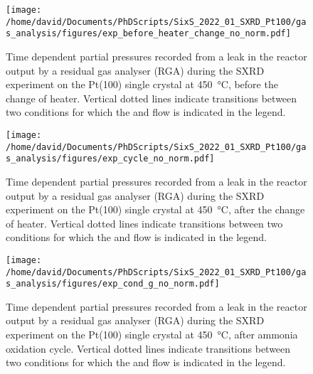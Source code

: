\begin{figure}[!htb]
    \centering
    \texttt{[image: /home/david/Documents/PhDScripts/SixS\_2022\_01\_SXRD\_Pt100/gas\_analysis/figures/exp\_before\_heater\_change\_no\_norm.pdf]}
    \caption{
        Time dependent partial pressures recorded from a leak in the reactor output by a residual gas analyser (RGA) during the SXRD experiment on the Pt(100) single crystal at \qty{450}{\degreeCelsius}, before the change of heater.
        Vertical dotted lines indicate transitions between two conditions for which the  and  flow is indicated in the legend.
    }
    \label{fig:RGA450Pt100BeforeHeaterChange}
\end{figure}

\begin{figure}[!htb]
    \centering
    \texttt{[image: /home/david/Documents/PhDScripts/SixS\_2022\_01\_SXRD\_Pt100/gas\_analysis/figures/exp\_cycle\_no\_norm.pdf]}
    \caption{
        Time dependent partial pressures recorded from a leak in the reactor output by a residual gas analyser (RGA) during the SXRD experiment on the Pt(100) single crystal at \qty{450}{\degreeCelsius}, after the change of heater.
        Vertical dotted lines indicate transitions between two conditions for which the  and  flow is indicated in the legend.
    }
    \label{fig:RGA450Pt100Cycle}
\end{figure}

\begin{figure}[!htb]
    \centering
    \texttt{[image: /home/david/Documents/PhDScripts/SixS\_2022\_01\_SXRD\_Pt100/gas\_analysis/figures/exp\_cond\_g\_no\_norm.pdf]}
    \caption{
        Time dependent partial pressures recorded from a leak in the reactor output by a residual gas analyser (RGA) during the SXRD experiment on the Pt(100) single crystal at \qty{450}{\degreeCelsius}, after ammonia oxidation cycle.
        Vertical dotted lines indicate transitions between two conditions for which the  and  flow is indicated in the legend.
    }
    \label{fig:RGA450Pt100CondG}
\end{figure}